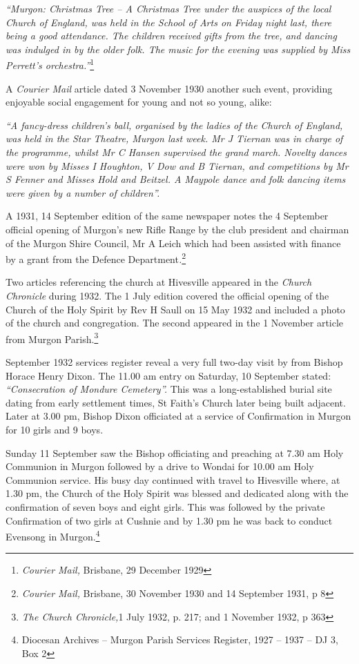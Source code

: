 \emph{``Murgon: Christmas Tree -- A Christmas Tree under the auspices of the local Church of England, was held in the School of Arts on Friday night last, there being a good attendance. The children received gifts from the tree, and dancing was indulged in by the older folk. The music for the evening was supplied by Miss Perrett's orchestra.''}\footnote{\emph{Courier Mail,} Brisbane, 29 December 1929}


A \emph{Courier Mail} article dated 3 November 1930 another such event, providing enjoyable social engagement for young and not so young, alike:



\emph{``A fancy-dress children's ball, organised by the ladies of the Church of England, was held in the Star Theatre, Murgon last week. Mr J Tiernan was in charge of the programme, whilst Mr C Hansen supervised the grand march. Novelty dances were won by Misses I Houghton, V Dow and B Tiernan, and competitions by Mr S Fenner and Misses Hold and Beitzel. A Maypole dance and folk dancing items were given by a number of children''.}



A 1931, 14 September edition of the same newspaper notes the 4 September official opening of Murgon's new Rifle Range by the club president and chairman of the Murgon Shire Council, Mr A Leich which had been assisted with finance by a grant from the Defence Department\emph{.}\footnote{\emph{Courier Mail,} Brisbane, 30 November 1930 and 14 September 1931, p 8}


Two articles referencing the church at Hivesville appeared in the \emph{Church Chronicle} during 1932. The 1 July edition covered the official opening of the Church of the Holy Spirit by Rev H Saull on 15 May 1932 and included a photo of the church and congregation. The second appeared in the 1 November article from Murgon Parish.\footnote{\emph{The Church Chronicle,}1 July 1932, p. 217; and 1 November 1932, p 363}


September 1932 services register reveal a very full two-day visit by from Bishop Horace Henry Dixon. The 11.00 am entry on Saturday, 10 September stated: \emph{``Consecration of Mondure Cemetery''.} This was a long-established burial site dating from early settlement times, St Faith's Church later being built adjacent. Later at 3.00 pm, Bishop Dixon officiated at a service of Confirmation in Murgon for 10 girls and 9 boys.



Sunday 11 September saw the Bishop officiating and preaching at 7.30 am Holy Communion in Murgon followed by a drive to Wondai for 10.00 am Holy Communion service. His busy day continued with travel to Hivesville where, at 1.30 pm, the Church of the Holy Spirit was blessed and dedicated along with the confirmation of seven boys and eight girls. This was followed by the private Confirmation of two girls at Cushnie and by 1.30 pm he was back to conduct Evensong in Murgon.\footnote{Diocesan Archives -- Murgon Parish Services Register, 1927 -- 1937 -- DJ 3, Box 2}


